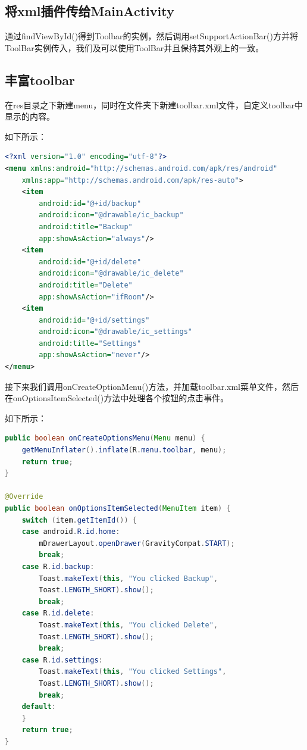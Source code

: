 \documentclass[UTF8, Microsoft YaHei]{book}
\begin{document}
	\subsection{将xml插件传给MainActivity}

	通过findViewById()得到Toolbar的实例，然后调用setSupportActionBar()方并将ToolBar实例传入，我们及可以使用ToolBar并且保持其外观上的一致。

	\subsection{丰富toolbar}
	在res目录之下新建menu，同时在文件夹下新建toolbar.xml文件，自定义toolbar中显示的内容。

	如下所示：

\begin{small}
\begin{lstlisting}[language=xml]
<?xml version="1.0" encoding="utf-8"?>
<menu xmlns:android="http://schemas.android.com/apk/res/android"
    xmlns:app="http://schemas.android.com/apk/res-auto">
    <item
        android:id="@+id/backup"
        android:icon="@drawable/ic_backup"
        android:title="Backup"
        app:showAsAction="always"/>
    <item
        android:id="@+id/delete"
        android:icon="@drawable/ic_delete"
        android:title="Delete"
        app:showAsAction="ifRoom"/>
    <item
        android:id="@+id/settings"
        android:icon="@drawable/ic_settings"
        android:title="Settings"
        app:showAsAction="never"/>
</menu>
\end{lstlisting}
\end{small}

	接下来我们调用onCreateOptionMenu()方法，并加载toolbar.xml菜单文件，然后在onOptionsItemSelected()方法中处理各个按钮的点击事件。

	如下所示：

\begin{small}
\begin{lstlisting}[language=java]
public boolean onCreateOptionsMenu(Menu menu) {
    getMenuInflater().inflate(R.menu.toolbar, menu);
    return true;
}

@Override
public boolean onOptionsItemSelected(MenuItem item) {
    switch (item.getItemId()) {
    case android.R.id.home:
        mDrawerLayout.openDrawer(GravityCompat.START);
        break;
    case R.id.backup:
        Toast.makeText(this, "You clicked Backup",
        Toast.LENGTH_SHORT).show();
        break;
    case R.id.delete:
        Toast.makeText(this, "You clicked Delete",
        Toast.LENGTH_SHORT).show();
        break;
    case R.id.settings:
        Toast.makeText(this, "You clicked Settings",
        Toast.LENGTH_SHORT).show();
        break;
    default:
    }
    return true;
}
\end{lstlisting}
\end{small}
\end{document}
